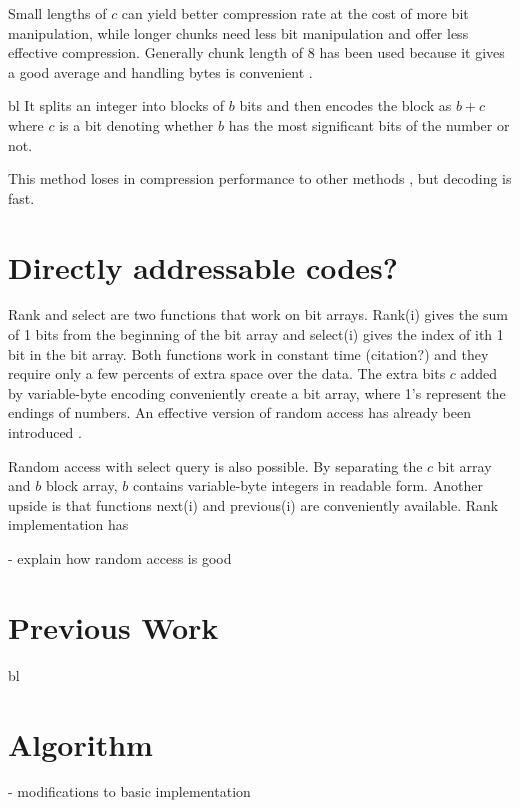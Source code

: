 Small lengths of $c$ can yield better
compression rate at the cost of more bit manipulation, while longer chunks need less bit manipulation and offer less effective compression. 
Generally chunk length of 8 has been used because it gives a good average and handling bytes is convenient \citep{IRbook}.

bl 
It splits an integer into blocks of $b$ bits and then encodes
the block as $b + c$ where $c$ is a bit denoting whether $b$ has the most significant bits of the number or not. 

This method loses in compression performance to other methods \citep{Bri09}, but decoding is fast.



\chapter{Directly addressable codes?}
Rank and select are two functions that work on bit arrays. Rank(i) gives the sum of 1 bits from the beginning of the bit array and select(i) gives
the index of ith 1 bit in the bit array. Both functions work in constant time (citation?) and they require only a few percents of extra space over
the data. The extra bits $c$ added by variable-byte encoding conveniently create a bit array, where 1's represent the endings of numbers. An effective
version of random access has already been introduced \citep{Bri09}. 

Random access with select query is also possible.  By separating the $c$ bit array and $b$ block array, $b$ contains variable-byte integers 
in readable form. Another upside is that functions next(i) and previous(i) are conveniently available. Rank implementation has 

- explain how random access is good 

\chapter{Previous Work}
bl

\chapter{Algorithm}

 - modifications to basic implementation
 
